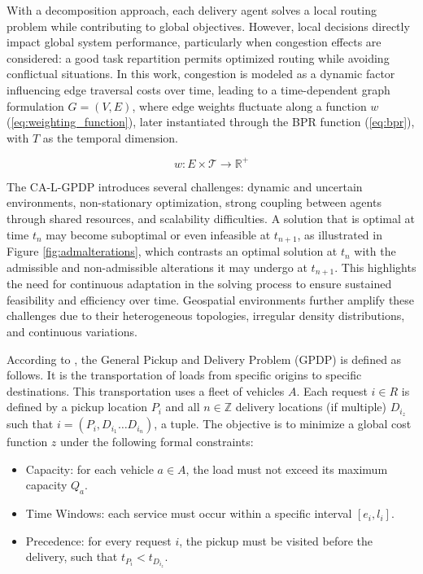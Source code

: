 \documentclass[sigconf]{acmart}
\begin{document}
With a decomposition approach, each delivery agent solves a local routing problem while contributing to global objectives. However, local decisions directly impact global system performance, particularly when congestion effects are considered: a good task repartition permits optimized routing while avoiding conflictual situations. In this work, congestion is modeled as a dynamic factor influencing edge traversal costs over time, leading to a time-dependent graph formulation $G = (V, E)$, where edge weights fluctuate along a function $w$ (\ref{eq:weighting_function}), later instantiated through the BPR function (\ref{eq:bpr}), with $T$ as the temporal dimension.

\begin{equation}
w: E \times \mathcal{T} \rightarrow \mathbb{R}^+
\label{eq:weighting_function}
\end{equation}

The CA-L-GPDP introduces several challenges: dynamic and uncertain environments, non-stationary optimization, strong coupling between agents through shared resources, and scalability difficulties. A solution that is optimal at time $t_n$ may become suboptimal or even infeasible at $t_{n+1}$, as illustrated in Figure \ref{fig:admalterations}, which contrasts an optimal solution at $t_n$ with the admissible and non-admissible alterations it may undergo at $t_{n+1}$. This highlights the need for continuous adaptation in the solving process to ensure sustained feasibility and efficiency over time. Geospatial environments further amplify these challenges due to their heterogeneous topologies, irregular density distributions, and continuous variations.

According to \cite{Savelsbergh1995}, the General Pickup and Delivery Problem (GPDP) is defined as follows. It is the transportation of loads from specific origins to specific destinations. This transportation uses a fleet of vehicles $A$. Each request $i \in R$ is defined by a pickup location $P_i$ and all $n \in \mathbb{Z}$ delivery locations (if multiple) $D_{i_z}$ such that $i = (P_i, D_{i_1} \dots D_{i_n})$, a tuple. The objective is to minimize a global cost function $z$ under the following formal constraints:

\begin{itemize}
    \item Capacity: for each vehicle $a \in A$, the load must not exceed its maximum capacity $Q_a$.
    \item Time Windows: each service must occur within a specific interval $[e_i, l_i]$.
    \item Precedence: for every request $i$, the pickup must be visited before the delivery, such that $t_{P_i} < t_{D_{i_z}}$.
\end{itemize}
\end{document}
